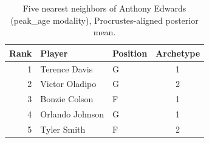 \begin{table}[htbp]
  \centering\small
  \begin{tabular}{rllc}
    \toprule
    Rank & Player & Position & Archetype \\
    \midrule
    1 & Terence Davis & G & 1 \\
    2 & Victor Oladipo & G & 2 \\
    3 & Bonzie Colson & F & 1 \\
    4 & Orlando Johnson & G & 1 \\
    5 & Tyler Smith & F & 2 \\
    \bottomrule
  \end{tabular}
  \caption{Five nearest neighbors of Anthony Edwards (peak_age modality), Procrustes-aligned posterior mean.}
  \label{tab:Anthony_Edwards_neighbors_peak_age}
\end{table}

